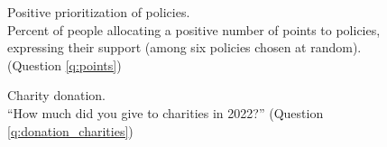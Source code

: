 \begin{figure}[h!] 
    \caption[Positive prioritization of policies]{Positive prioritization of policies. \\ Percent of people allocating a positive number of points to policies, expressing their support (among six policies chosen at random). (Question \ref{q:points})}\label{fig:points_positive}
\end{figure}

\begin{figure}[h!]
    \caption[Charity donation]{Charity donation. \\ ``How much did you give to charities in 2022?'' (Question \ref{q:donation_charities})}\label{fig:donation_charities}
\end{figure}

